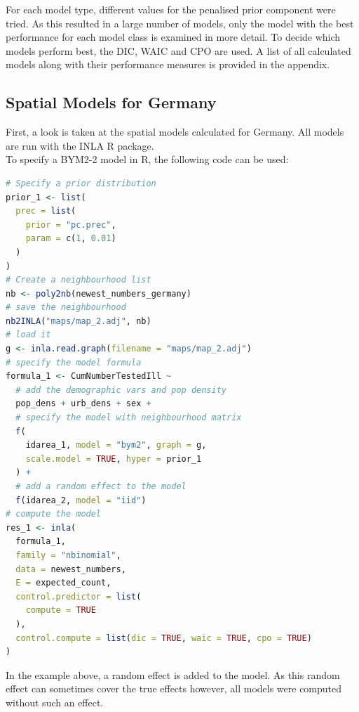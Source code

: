 For each model type, different values for the penalised prior component were tried. As this resulted in a large number of models, only the model with the best performance for each model class is examined in more detail. To decide which models perform best, the DIC, WAIC and CPO are used. A list of all calculated models along with their performance measures is provided in the appendix.
\subsection{Spatial Models for Germany}
First, a look is taken at the spatial models calculated for Germany. All models are run with the INLA \cite{rinla} R package.\\
To specify a BYM2-2 model in R, the following code can be used:
\begin{lstlisting}[language=R]
# Specify a prior distribution
prior_1 <- list(
  prec = list(
    prior = "pc.prec",
    param = c(1, 0.01)
  )
)
# Create a neighbourhood list
nb <- poly2nb(newest_numbers_germany)
# save the neighbourhood
nb2INLA("maps/map_2.adj", nb)
# load it
g <- inla.read.graph(filename = "maps/map_2.adj")
# specify the model formula
formula_1 <- CumNumberTestedIll ~
  # add the demographic vars and pop density
  pop_dens + urb_dens + sex + 
  # specify the model with neighbourhood matrix
  f(
    idarea_1, model = "bym2", graph = g,
    scale.model = TRUE, hyper = prior_1
  ) +
  # add a random effect to the model
  f(idarea_2, model = "iid")
# compute the model
res_1 <- inla(
  formula_1,
  family = "nbinomial",
  data = newest_numbers,
  E = expected_count,
  control.predictor = list(
    compute = TRUE
  ),
  control.compute = list(dic = TRUE, waic = TRUE, cpo = TRUE)
)
\end{lstlisting}
In the example above, a random effect is added to the model. As this random effect can sometimes cover the true effects however, all models were computed without such an effect.
